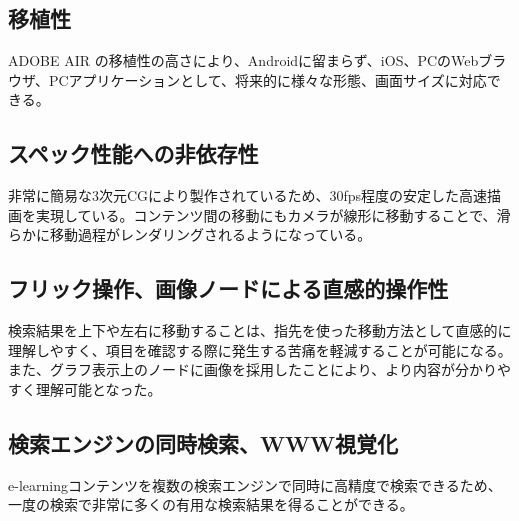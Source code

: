 \subsection{移植性}
ADOBE AIR の移植性の高さにより、Androidに留まらず、iOS、PCのWebブラウザ、PCアプリケーションとして、将来的に様々な形態、画面サイズに対応できる。

\subsection{スペック性能への非依存性}
非常に簡易な3次元CGにより製作されているため、30fps程度の安定した高速描画を実現している。コンテンツ間の移動にもカメラが線形に移動することで、滑らかに移動過程がレンダリングされるようになっている。

\subsection{フリック操作、画像ノードによる直感的操作性}
検索結果を上下や左右に移動することは、指先を使った移動方法として直感的に理解しやすく、項目を確認する際に発生する苦痛を軽減することが可能になる。また、グラフ表示上のノードに画像を採用したことにより、より内容が分かりやすく理解可能となった。

\subsection{検索エンジンの同時検索、WWW視覚化}
e-learningコンテンツを複数の検索エンジンで同時に高精度で検索できるため、一度の検索で非常に多くの有用な検索結果を得ることができる。